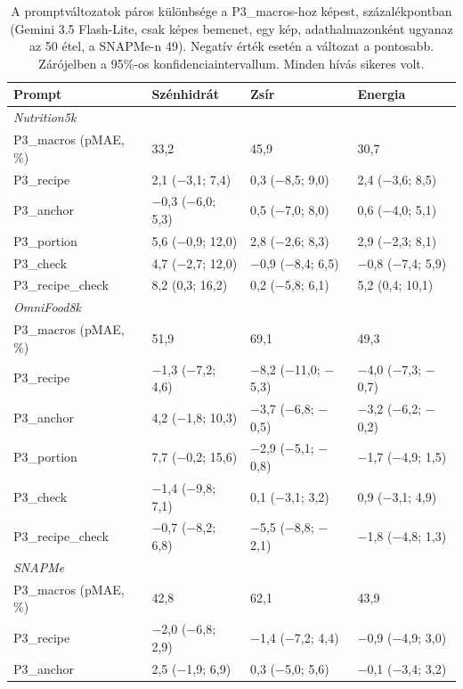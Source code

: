 \begin{table}[p]
\centering
\caption{A promptváltozatok páros különbsége a P3\_macros-hoz képest, százalékpontban 
(Gemini 3.5 Flash-Lite, csak képes bemenet, egy kép, adathalmazonként ugyanaz az 50 étel, a SNAPMe-n 49). 
Negatív érték esetén a változat a pontosabb. Zárójelben a 95\%-os konfidenciaintervallum. 
Minden hívás sikeres volt.}
\label{tab:elomeres_promptok}
{\linespread{1}\selectfont\small\setlength{\tabcolsep}{4pt}
\begin{tabular}{llll}
\hline
Prompt & Szénhidrát & Zsír & Energia \\
\hline
\multicolumn{4}{l}{\textit{Nutrition5k}} \\
P3\_macros (pMAE, \%) & 33,2 & 45,9 & 30,7 \\
P3\_recipe & 2,1 ($-$3,1; 7,4) & 0,3 ($-$8,5; 9,0) & 2,4 ($-$3,6; 8,5) \\
P3\_anchor & $-$0,3 ($-$6,0; 5,3) & 0,5 ($-$7,0; 8,0) & 0,6 ($-$4,0; 5,1) \\
P3\_portion & 5,6 ($-$0,9; 12,0) & 2,8 ($-$2,6; 8,3) & 2,9 ($-$2,3; 8,1) \\
P3\_check & 4,7 ($-$2,7; 12,0) & $-$0,9 ($-$8,4; 6,5) & $-$0,8 ($-$7,4; 5,9) \\
P3\_recipe\_check & 8,2 (0,3; 16,2) & 0,2 ($-$5,8; 6,1) & 5,2 (0,4; 10,1) \\
\hline
\multicolumn{4}{l}{\textit{OmniFood8k}} \\
P3\_macros (pMAE, \%) & 51,9 & 69,1 & 49,3 \\
P3\_recipe & $-$1,3 ($-$7,2; 4,6) & $-$8,2 ($-$11,0; $-$5,3) & $-$4,0 ($-$7,3; $-$0,7) \\
P3\_anchor & 4,2 ($-$1,8; 10,3) & $-$3,7 ($-$6,8; $-$0,5) & $-$3,2 ($-$6,2; $-$0,2) \\
P3\_portion & 7,7 ($-$0,2; 15,6) & $-$2,9 ($-$5,1; $-$0,8) & $-$1,7 ($-$4,9; 1,5) \\
P3\_check & $-$1,4 ($-$9,8; 7,1) & 0,1 ($-$3,1; 3,2) & 0,9 ($-$3,1; 4,9) \\
P3\_recipe\_check & $-$0,7 ($-$8,2; 6,8) & $-$5,5 ($-$8,8; $-$2,1) & $-$1,8 ($-$4,8; 1,3) \\
\hline
\multicolumn{4}{l}{\textit{SNAPMe}} \\
P3\_macros (pMAE, \%) & 42,8 & 62,1 & 43,9 \\
P3\_recipe & $-$2,0 ($-$6,8; 2,9) & $-$1,4 ($-$7,2; 4,4) & $-$0,9 ($-$4,9; 3,0) \\
P3\_anchor & 2,5 ($-$1,9; 6,9) & 0,3 ($-$5,0; 5,6) & $-$0,1 ($-$3,4; 3,2) \\

\end{tabular}}
\end{table}
